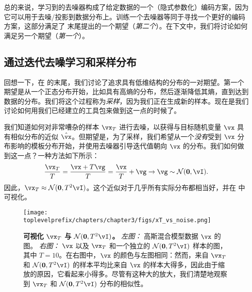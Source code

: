 \documentclass[../../book-main.tex]{subfiles}
\begin{document}
总的来说，学习到的去噪器构成了给定数据的一个（隐式参数化）编码方案，因为它可以用于去噪/投影到数据分布上。训练一个去噪器等同于寻找一个更好的编码方案，这部分满足了  末尾提出的一个期望（\textit{第二个}）。在下文中，我们将讨论如何满足另一个期望（\textit{第一个}）。


\subsection{通过迭代去噪学习和采样分布}\label{sub:sampling_denoising}

回想一下，在  的末尾，我们讨论了追求具有低维结构的分布的一对期望。第一个期望是从一个正态分布开始，比如具有高熵的分布，然后逐渐降低其熵，直到达到数据的分布。我们将这个过程称为\textit{采样}，因为我们正在生成新的样本。现在是我们讨论如何用我们已经建立的工具包来做到这一点的时候了。

我们知道如何对非常嘈杂的样本 \(\vx_{T}\) 进行去噪，以获得与目标随机变量 \(\vx\) 具有相似分布的近似 \(\hat{\vx}\)。但期望是，为了采样，我们希望从一个\textit{没有}受到 \(\vx\) 分布影响的模板分布开始，并使用去噪器引导迭代值朝向 \(\vx\) 的分布。我们如何做到这一点？一种方法如下所示：
\begin{equation}\label{eq:ve_converge_to_large_gaussian}
	\frac{\vx_{T}}{T} = \frac{\vx + T\vg}{T} = \frac{\vx}{T} + \vg \to \vg \sim \dNorm(\vzero, \vI).
\end{equation}
因此，\(\vx_{T} \approx \dNorm(\vzero, T^{2}\vI)\)。这个近似对于几乎所有实际分布都相当好，并在  中可视化。
\begin{figure}
	\centering 
	\texttt{[image: \\toplevelprefix/chapters/chapter3/figs/xT\_vs\_noise.png]}
	\caption{\small\textbf{可视化 \(\vx_{T}\) 与 \(\dNorm(\vzero, T^{2}\vI)\)。} \textit{左图：} 高斯混合模型数据 \(\vx\) 的图。 \textit{右图：} \(\vx\) 以及 \(\vx_{T}\) 和一个独立的 \(\dNorm(\vzero, T^{2}\vI)\) 样本的图，其中 \(T = 10\)。在右图中，\(\vx\) 的颜色与左图相同：然而，来自 \(\vx_{T}\) 和 \(\dNorm(\vzero, T^{2}\vI)\) 的样本平均比来自 \(\vx\) 的样本大得多，因此由于缩放的原因，它看起来小得多。尽管有这种大的放大，我们清楚地观察到 \(\vx_{T}\) 和 \(\dNorm(\vzero, T^{2}\vI)\) 分布的相似性。}
	\label{fig:xT_vs_noise}
\end{figure}
\end{document}
